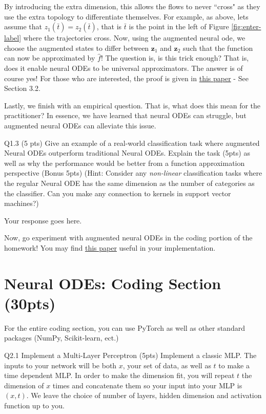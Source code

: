 \documentclass[12pt,letterpaper, onecolumn]{exam}
\theoremstyle{definition}
\begin{document}
By introducing the extra dimension, this allows the flows to never ``cross" as they use the extra topology to differentiate themselves. For example, as above, lets assume that $z_1(\bar{t}) = z_2(\bar{t})$, that is $\bar{t}$ is the point in the left of Figure \ref{fig:enter-label} where the trajectories cross. Now, using the augmented neural ode, we choose the augmented states to differ between $\bm{z}_1$ and $\bm{z}_2$ such that the function can now be approximated by $\hat{f}$! The question is, is this trick enough? That is, does it enable neural ODEs to be universal approximators. The answer is of course yes! For those who are interested, the proof is given in \href{https://arxiv.org/pdf/2202.02435}{this paper}  - See Section 3.2. 

Lastly, we finish with an empirical question. That is, what does this mean for the practitioner? In essence, we have learned that neural ODEs can struggle, but augmented neural ODEs can alleviate this issue. 

\color{orange} Q1.3 (5 pts) \color{black} Give an example of a real-world classification task where augmented Neural ODEs outperform traditional Neural ODEs. Explain the task (5pts) as well as why the performance would be better from a function approximation perspective (Bonus 5pts) (Hint: Consider any \emph{non-linear} classification tasks where the regular Neural ODE has the same dimension as the number of categories as the classifier. Can you make any connection to kernels in support vector machines?) 

\begin{tcolorbox}\centering
    Your response goes here. 
\end{tcolorbox}

 
 Now, go experiment with augmented neural ODEs in the coding portion of the homework! You may find \href{https://arxiv.org/abs/1904.01681}{this paper} useful in your implementation. 

\section{Neural ODEs: Coding Section (30pts)}
For the entire coding section, you can use PyTorch as well as other standard packages (NumPy, Scikit-learn, ect.)

\color{orange} Q2.1 Implement a Multi-Layer Perceptron (5pts) \color{black} Implement a classic MLP. The inputs to your network will be both $x$, your set of data, as well as $t$ to make a time dependent MLP. In order to make the dimension fit, you will repeat $t$ the dimension of $x$ times and concatenate them so your input into your MLP is $(x, t)$. We leave the choice of number of layers, hidden dimension and activation function up to you. 
\end{document}
